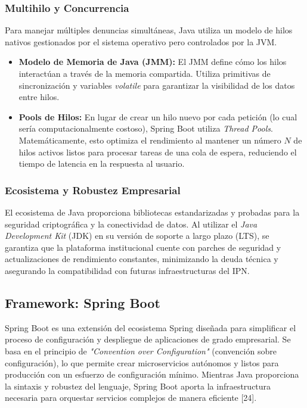 \subsubsection{Multihilo y Concurrencia}
Para manejar múltiples denuncias simultáneas, Java utiliza un modelo de hilos nativos gestionados por el sistema operativo pero controlados por la JVM.
\begin{itemize}
    \item \textbf{Modelo de Memoria de Java (JMM):} El JMM define cómo los hilos interactúan a través de la memoria compartida. Utiliza primitivas de sincronización y variables \textit{volatile} para garantizar la visibilidad de los datos entre hilos. 
    \item \textbf{Pools de Hilos:} En lugar de crear un hilo nuevo por cada petición (lo cual sería computacionalmente costoso), Spring Boot utiliza \textit{Thread Pools}. Matemáticamente, esto optimiza el rendimiento al mantener un número $N$ de hilos activos listos para procesar tareas de una cola de espera, reduciendo el tiempo de latencia en la respuesta al usuario.
\end{itemize}

\subsubsection{Ecosistema y Robustez Empresarial}
El ecosistema de Java proporciona bibliotecas estandarizadas y probadas para la seguridad criptográfica y la conectividad de datos. Al utilizar el \textit{Java Development Kit} (JDK) en su versión de soporte a largo plazo (LTS), se garantiza que la plataforma institucional cuente con parches de seguridad y actualizaciones de rendimiento constantes, minimizando la deuda técnica y asegurando la compatibilidad con futuras infraestructuras del IPN.

\subsection{Framework: Spring Boot}

Spring Boot es una extensión del ecosistema Spring diseñada para simplificar el proceso de configuración y despliegue de aplicaciones de grado empresarial. Se basa en el principio de \textit{"Convention over Configuration"} (convención sobre configuración), lo que permite crear microservicios autónomos y listos para producción con un esfuerzo de configuración mínimo. Mientras Java proporciona la sintaxis y robustez del lenguaje, Spring Boot aporta la infraestructura necesaria para orquestar servicios complejos de manera eficiente [24].



